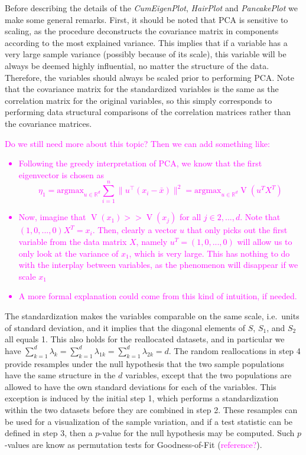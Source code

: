\documentclass[titlepage,11pt,twoside]{article}
\newcommand{\hl}[1]{\textcolor{magenta}{#1}}
\newcommand{\RR}{\mathbb{R}}
\DeclareMathOperator*{\V}{V}
\newcommand{\argmax}{\text{argmax}}
\begin{document}
Before describing the details of the  \emph{CumEigenPlot}, \emph{HairPlot} and \emph{PancakePlot} we make some general remarks. First, it should be noted that PCA is sensitive to scaling, as the procedure deconstructs the covariance matrix in components according to the most explained variance. This implies that if a variable has a very large sample variance (possibly because of its scale), this variable will be always be deemed highly influential, no matter the structure of the data. Therefore, the variables should always be scaled prior to performing PCA. Note that the covariance matrix for the standardized variables is the same as the correlation matrix for the original variables, so this simply corresponds to performing data structural comparisons of the correlation matrices rather than the covariance matrices. \hl{Do we still need more about this topic? Then we can add something like:
\begin{itemize}
\item Following the greedy interpretation of PCA, we know that the first eigenvector is chosen as
$$\eta_1 = \argmax_{u \in \RR^d} \sum_{i=1}^n \lVert u^\top (x_i - \bar{x}) \rVert^2  = \text{argmax}_{u \in \RR^d} \V(u^T X^T) $$
\item Now, imagine that $\V(x_1) >> \V(x_j)$ for all $j \in 2, ..., d$. Note that $(1, 0, ..., 0) X^T = x_i$. Then, clearly a vector $u$ that only picks out the first variable from the data matrix $X$, namely $u^T = (1, 0, ..., 0)$ will allow us to only look at the variance of $x_1$, which is very large. This has nothing to do with the interplay between variables, as the phenomenon will disappear if we scale $x_1$
\item A more formal explanation could come from this kind of intuition, if needed.
\end{itemize}
}
The standardization makes the variables comparable on the same scale, i.e.\ units of standard deviation, and it implies that the diagonal elements of $S$, $S_1$, and $S_2$ all equals 1. This also holds for the reallocated datasets, and in particular we have $\sum_{k=1}^d \lambda_k = \sum_{k=1}^d \lambda_{1k} = \sum_{k=1}^d \lambda_{2k} =  d$. The random reallocations in step 4 provide resamples under the null hypothesis that the two sample populations have the same structure in the $d$ variables, except that the two populations are allowed to have the own standard deviations for each of the variables. This exception is induced by the initial step 1, which performs a standardization within the two datasets before they are combined in step 2. These resamples can be used for a visualization of the sample variation, and if a test statistic can be defined in step 3, then a $p$-value for the null hypothesis may be computed. Such $p$-values are know as permutation tests for Goodness-of-Fit (\hl{reference?}).
\end{document}
